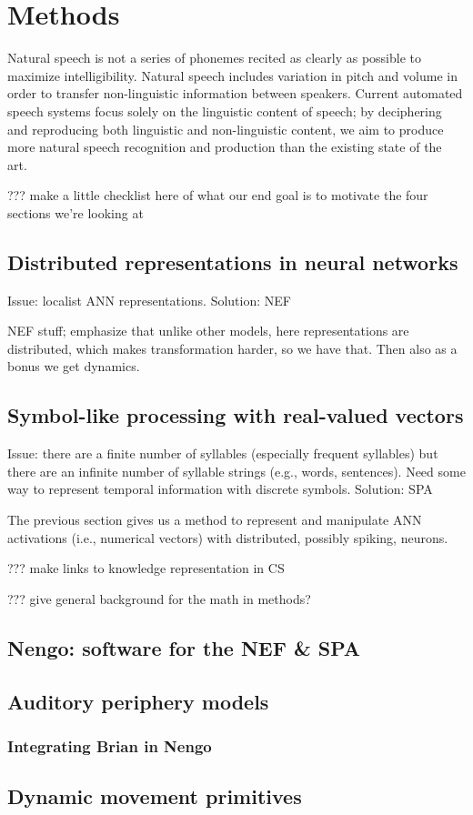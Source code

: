 \chapter{Methods}

Natural speech is not a series of phonemes
recited as clearly as possible
to maximize intelligibility.
Natural speech includes variation in
pitch and volume in order to transfer
non-linguistic information between speakers.
Current automated speech systems
focus solely on the linguistic content
of speech;
by deciphering and reproducing both
linguistic and non-linguistic content,
we aim to produce more natural speech
recognition and production
than the existing state of the art.

??? make a little checklist here of what our end goal
is to motivate the four sections we're looking at

\section{Distributed representations in neural networks}

Issue: localist ANN representations. Solution: NEF

NEF stuff; emphasize that unlike other models,
here representations are distributed,
which makes transformation harder,
so we have that.
Then also as a bonus we get dynamics.

\section{Symbol-like processing with real-valued vectors}

Issue: there are a finite number of syllables
(especially frequent syllables) but there are an infinite
number of syllable strings (e.g., words, sentences).
Need some way to represent temporal information
with discrete symbols.
Solution: SPA

The previous section gives us a method to represent
and manipulate ANN activations (i.e., numerical vectors)
with distributed, possibly spiking, neurons.

??? make links to knowledge representation in CS

??? give general background for the math in methods?

\section{Nengo: software for the NEF \& SPA}

\section{Auditory periphery models}

\subsection{Integrating Brian in Nengo}

\section{Dynamic movement primitives}
